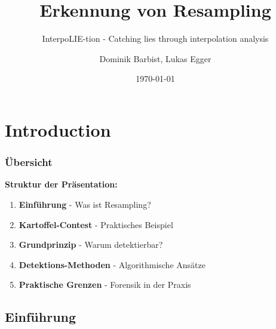 \documentclass[11pt,t,usepdftitle=false,aspectratio=169]{beamer}
\title[Erkennung von Resampling]{Erkennung von Resampling}
\subtitle{InterpoLIE-tion - Catching lies through interpolation analysis}
\author[Dominik Barbist, Lukas Egger]{Dominik Barbist, Lukas Egger \\ \vspace{0.5em}}
\date{\today}
\begin{document}
\section{Introduction}

\begin{frame}
	\frametitle{Übersicht}
	
	\textbf{Struktur der Präsentation:}
	
	\vspace{1.5em}
	
	\begin{enumerate}
		\setlength{\itemsep}{0.8em}
		\item \textbf{Einführung} - Was ist Resampling?
		\item \textbf{Kartoffel-Contest} - Praktisches Beispiel
		\item \textbf{Grundprinzip} - Warum detektierbar?
		\item \textbf{Detektions-Methoden} - Algorithmische Ansätze
		\item \textbf{Praktische Grenzen} - Forensik in der Praxis
	\end{enumerate}
\end{frame}

\subsection{Einführung}
\end{document}
